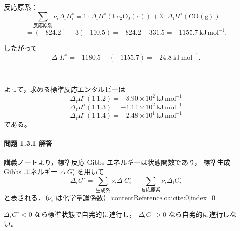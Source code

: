 \documentclass[a4paper,12pt]{jlreq}
\begin{document}
反応原系：
\[
\sum_{\text{反応原系}} \nu_i \Delta_{\mathrm f}H_i^\circ
= 1\cdot\Delta_{\mathrm f}H^\circ(\mathrm{Fe_2O_3(c)})
  + 3\cdot\Delta_{\mathrm f}H^\circ(\mathrm{CO(g)})
\]
\[
= (-824.2) + 3(-110.5)
= -824.2 - 331.5
= -1155.7\ \mathrm{kJ\,mol^{-1}}.
\]

したがって
\[
\Delta_{\mathrm r}H^\circ
= -1180.5 - (-1155.7)
= -24.8\ \mathrm{kJ\,mol^{-1}}.
\]

-------------------------------------------------------------------------------

\noindent
よって，求める標準反応エンタルピーは
\[
\boxed{\Delta_{\mathrm r}H^\circ(1.1.2) = -8.90\times10^{2}\ \mathrm{kJ\,mol^{-1}}}
\]
\[
\boxed{\Delta_{\mathrm r}H^\circ(1.1.3) = -1.14\times10^{2}\ \mathrm{kJ\,mol^{-1}}}
\]
\[
\boxed{\Delta_{\mathrm r}H^\circ(1.1.4) = -2.48\times10^{1}\ \mathrm{kJ\,mol^{-1}}}
\]
である。






\newpage




\paragraph{問題 1.3.1 解答}

講義ノートより，標準反応 Gibbs エネルギーは状態関数であり，
標準生成 Gibbs エネルギー $\Delta_{\mathrm f}G_i^\circ$ を用いて
\[
\Delta_{\mathrm r}G^\circ
  = \sum_{\text{生成系}} \nu_i \Delta_{\mathrm f}G_i^\circ
  - \sum_{\text{反応原系}} \nu_i \Delta_{\mathrm f}G_i^\circ
\]
と表される．（$\nu_i$ は化学量論係数）:contentReference[oaicite:0]{index=0}  

$\Delta_{\mathrm r}G^\circ<0$ なら標準状態で自発的に進行し，
$\Delta_{\mathrm r}G^\circ>0$ なら自発的に進行しない。
\end{document}
